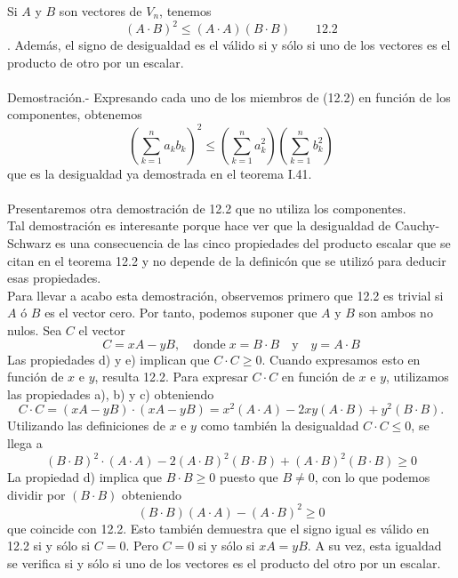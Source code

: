\begin{teo} Si $A$ y $B$ son vectores de $V_n$, tenemos $$(A\cdot B)^2 \leq (A\cdot A)(B\cdot B) \qquad \mbox{12.2}$$.
Además, el signo de desigualdad es el válido si y sólo si uno de los vectores es el producto de otro por un escalar.\\\\
    Demostración.-\; Expresando cada uno de los miembros de (12.2) en función de los componentes, obtenemos $$\left(\sum_{k=1}^n a_kb_k\right)^2\leq \left(\sum_{k=1}^n a_k^2\right)\left(\sum_{k=1}^n b_k^2\right)$$
    que es la desigualdad ya demostrada en el teorema I.41.\\\\
    Presentaremos otra demostración de 12.2 que no utiliza los componentes.\\
    Tal demostración es interesante porque hace ver que la desigualdad de Cauchy-Schwarz es una consecuencia de las cinco propiedades del producto escalar que se citan en el teorema 12.2 y no depende de la definicón que se utilizó para deducir esas propiedades.\\
    Para llevar a acabo esta demostración, observemos primero que 12.2 es trivial si $A$ ó $B$ es el vector cero. Por tanto, podemos suponer que $A$ y $B$ son ambos no nulos. Sea $C$ el vector 
    $$C=xA-yB, \quad \mbox{donde}\; x=B\cdot B \quad \mbox{y} \quad y=A\cdot B$$
    Las propiedades d) y e) implican que $C\cdot C \geq 0$. Cuando expresamos esto en función de $x$ e $y$, resulta 12.2. Para expresar $C\cdot C$ en función de $x$ e $y$, utilizamos las propiedades a), b) y c) obteniendo $$C\cdot C = (xA-yB)\cdot (xA-yB) = x^2(A\cdot A) - 2xy(A\cdot B) + y^2(B\cdot B).$$
    Utilizando las definiciones de $x$ e $y$ como también la desigualdad $C\cdot C\leq 0$, se llega a $$(B\cdot B)^2\cdot(A\cdot A) -2(A\cdot B)^2(B\cdot B)+(A\cdot B)^2(B\cdot B)\geq 0$$
    La propiedad d) implica que $B\cdot B \geq 0$ puesto que $B\neq 0$, con lo que podemos dividir por $(B\cdot B)$ obteniendo $$(B\cdot B)(A\cdot A)-(A\cdot B)^2\geq 0$$
    que coincide con 12.2. Esto también demuestra que el signo igual es válido en 12.2 si y sólo si $C=0$. Pero $C=0$ si y sólo si $xA=yB$. A su vez, esta igualdad se verifica si y sólo si uno de los vectores es el producto del otro por un escalar.\\\\

\end{teo}


